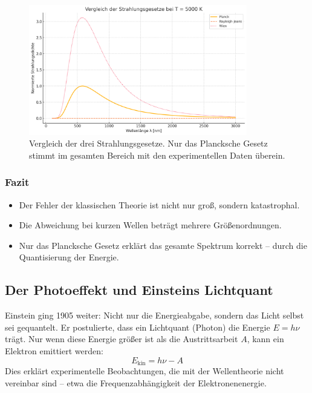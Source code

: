 \begin{figure}[H]
	\centering
	\includegraphics[width=0.85\textwidth]{bilder/strahlungsgesetze.png}
	\caption{Vergleich der drei Strahlungsgesetze. Nur das Plancksche Gesetz stimmt im gesamten Bereich mit den experimentellen Daten überein.}
	\label{fig:strahlungsgesetze}
\end{figure}

\subsubsection{Fazit}

\begin{itemize}
	\item Der Fehler der klassischen Theorie ist nicht nur groß, sondern katastrophal.
	\item Die Abweichung bei kurzen Wellen beträgt mehrere Größenordnungen.
	\item Nur das Plancksche Gesetz erklärt das gesamte Spektrum korrekt – durch die Quantisierung der Energie.
\end{itemize}

\subsection{Der Photoeffekt und Einsteins Lichtquant}

Einstein ging 1905 weiter: Nicht nur die Energieabgabe, sondern das Licht selbst sei gequantelt. Er postulierte, dass ein Lichtquant (Photon) die Energie \( E = h\nu \) trägt. Nur wenn diese Energie größer ist als die Austrittsarbeit \( A \), kann ein Elektron emittiert werden:  
\[
E_{\text{kin}} = h\nu - A
\]
Dies erklärt experimentelle Beobachtungen, die mit der Wellentheorie nicht vereinbar sind – etwa die Frequenzabhängigkeit der Elektronenenergie.


